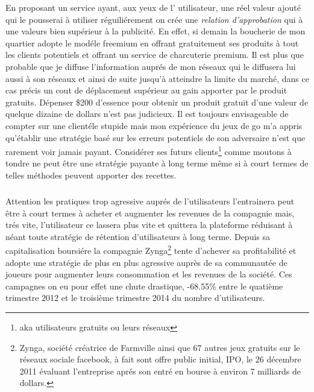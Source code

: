 \documentclass[11pt, a4paper ]{article}
\begin{document}
En proposant un service ayant, aux yeux de l' utilisateur, une réel valeur ajouté qui le pousserai à utiliser réguiliérement on crée une \emph{relation d'approbation} qui à une valeurs bien supérieur à la publicité.
En effet, si demain la boucherie de mon quartier adopte le modéle freemium en offrant gratuitement ses produits à tout les clients potentiels et offrant un service de charcuterie premium.
Il est plus que probable que je diffuse l'information auprés de mon réseaux qui le diffusera lui aussi à son réseaux et ainsi de suite jusqu'à atteindre la limite du marché, dans ce cas précis un cout de déplacement supérieur au gain apporter par le produit gratuits.
Dépenser \$200 d'essence pour obtenir un produit gratuit d'une valeur de quelque dizaine de dollars n'est pas judicieux. Il est toujours envisageable de compter sur une clientéle stupide mais mon expérience du jeux de go m'a appris qu'établir une stratégie basé sur les erreurs potentiels de son adversaire n'est que rarement voir jamais payant.
Considérer ses futurs clients\footnote{aka utilisateurs gratuits ou leurs réseaux} comme moutons à tondre ne peut être une stratégie payante à long terme même si à court termes de telles méthodes peuvent apporter des recettes.
\subparagraph{}
Attention les pratiques trop agressive auprés de l'utilisateurs l'entrainera peut être à court termes à acheter et augmenter les revenues de la compagnie mais, trés vite, l'utilisateur ce lassera plus vite et quittera la plateforme réduisant à néant toute stratégie de rétention d'utilisateurs à long terme. Depuis sa capitalisation boursiére la compagnie Zynga\footnote{Zynga, société créatrice de Farmville ainsi que 67 autres jeux gratuits sur le réseaux sociale facebook, à fait sont offre public initial, IPO, le 26 décembre 2011 évaluant l'entreprise aprés son entré en bourse à environ 7 milliards de dollars.\cite{ipoZynga}} tente d'achever sa profitabilité et adopte une stratégie de plus en plus agressive auprès de sa communautée de joueurs pour augmenter leurs consommation et les revenues de la société. Ces campagnes on eu pour effet une chute drastique, -68.55\% entre le quatième trimestre 2012 et le troisième trimestre 2014 du nombre d'utilisateurs.
\end{document}
